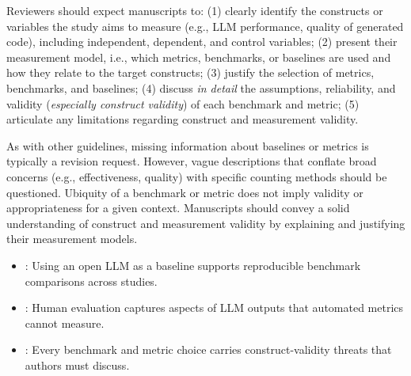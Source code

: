 
Reviewers should expect manuscripts to:
(1) clearly identify the constructs or variables the study aims to measure (e.g., LLM performance, quality of generated code), including independent, dependent, and control variables;
(2) present their measurement model, i.e., which metrics, benchmarks, or baselines are used and how they relate to the target constructs;
(3) justify the selection of metrics, benchmarks, and baselines;
(4) discuss \textit{in detail} the assumptions, reliability, and validity (\textit{especially construct validity}) of each benchmark and metric;
(5) articulate any limitations regarding construct and measurement validity.

As with other guidelines, missing information about baselines or metrics is typically a revision request. However, vague descriptions that conflate broad concerns (e.g., effectiveness, quality) with specific counting methods should be questioned. Ubiquity of a benchmark or metric does not imply validity or appropriateness for a given context. Manuscripts should convey a solid understanding of construct and measurement validity by explaining and justifying their measurement models.

\begin{itemize}[label=$\rightarrow$]
    \item \seeopenllm: Using an open LLM as a baseline supports reproducible benchmark comparisons across studies.
    \item \seehumanvalidation: Human evaluation captures aspects of LLM outputs that automated metrics cannot measure.
    \item \seelimitationsmitigations: Every benchmark and metric choice carries construct-validity threats that authors must discuss.
\end{itemize}
